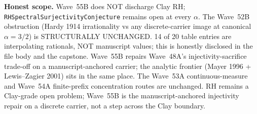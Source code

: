 \begin{remark}
\textbf{Honest scope.} Wave~55B does NOT discharge Clay RH; \texttt{RHSpectralSurjectivityConjecture} remains open at every $\alpha$. The Wave~52B obstruction (Hardy 1914 irrationality vs any discrete-carrier image at canonical $\alpha = 3/2$) is STRUCTURALLY UNCHANGED. 14 of 20 table entries are interpolating rationals, NOT manuscript values; this is honestly disclosed in the file body and the capstone. Wave~55B repairs Wave~48A's injectivity-sacrifice trade-off on a manuscript-anchored carrier; the analytic frontier (Mayer 1996 + Lewis--Zagier 2001) sits in the same place. The Wave~53A continuous-measure and Wave~54A finite-prefix concentration routes are unchanged. RH remains a Clay-grade open problem; Wave~55B is the manuscript-anchored injectivity repair on a discrete carrier, not a step across the Clay boundary.
\end{remark}


